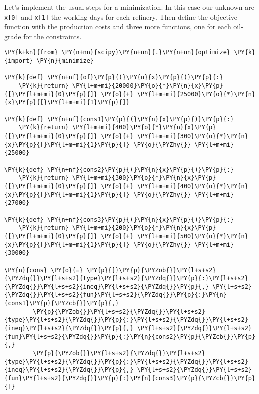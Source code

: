 \begin{Answer}
Let's implement the usual steps for a minimization. In this case our unknown are \texttt{x[0]} and \texttt{x[1]} the working days for each refinery. Then define the objective function with the production costs and three more functions, one for each oil-grade for the constraints.
\begin{codebox}[breakable, size=fbox, boxrule=1pt, pad at break*=1mm,colback=cellbackground, colframe=cellborder]
\begin{Verbatim}[commandchars=\\\{\}]
\PY{k+kn}{from} \PY{n+nn}{scipy}\PY{n+nn}{.}\PY{n+nn}{optimize} \PY{k}{import} \PY{n}{minimize}

\PY{k}{def} \PY{n+nf}{of}\PY{p}{(}\PY{n}{x}\PY{p}{)}\PY{p}{:}
    \PY{k}{return} \PY{l+m+mi}{20000}\PY{o}{*}\PY{n}{x}\PY{p}{[}\PY{l+m+mi}{0}\PY{p}{]} \PY{o}{+} \PY{l+m+mi}{25000}\PY{o}{*}\PY{n}{x}\PY{p}{[}\PY{l+m+mi}{1}\PY{p}{]}

\PY{k}{def} \PY{n+nf}{cons1}\PY{p}{(}\PY{n}{x}\PY{p}{)}\PY{p}{:}
    \PY{k}{return} \PY{l+m+mi}{400}\PY{o}{*}\PY{n}{x}\PY{p}{[}\PY{l+m+mi}{0}\PY{p}{]} \PY{o}{+} \PY{l+m+mi}{300}\PY{o}{*}\PY{n}{x}\PY{p}{[}\PY{l+m+mi}{1}\PY{p}{]} \PY{o}{\PYZhy{}} \PY{l+m+mi}{25000}

\PY{k}{def} \PY{n+nf}{cons2}\PY{p}{(}\PY{n}{x}\PY{p}{)}\PY{p}{:}
    \PY{k}{return} \PY{l+m+mi}{300}\PY{o}{*}\PY{n}{x}\PY{p}{[}\PY{l+m+mi}{0}\PY{p}{]} \PY{o}{+} \PY{l+m+mi}{400}\PY{o}{*}\PY{n}{x}\PY{p}{[}\PY{l+m+mi}{1}\PY{p}{]} \PY{o}{\PYZhy{}} \PY{l+m+mi}{27000}

\PY{k}{def} \PY{n+nf}{cons3}\PY{p}{(}\PY{n}{x}\PY{p}{)}\PY{p}{:}
    \PY{k}{return} \PY{l+m+mi}{200}\PY{o}{*}\PY{n}{x}\PY{p}{[}\PY{l+m+mi}{0}\PY{p}{]} \PY{o}{+} \PY{l+m+mi}{500}\PY{o}{*}\PY{n}{x}\PY{p}{[}\PY{l+m+mi}{1}\PY{p}{]} \PY{o}{\PYZhy{}} \PY{l+m+mi}{30000}

\PY{n}{cons} \PY{o}{=} \PY{p}{[}\PY{p}{\PYZob{}}\PY{l+s+s2}{\PYZdq{}}\PY{l+s+s2}{type}\PY{l+s+s2}{\PYZdq{}}\PY{p}{:}\PY{l+s+s2}{\PYZdq{}}\PY{l+s+s2}{ineq}\PY{l+s+s2}{\PYZdq{}}\PY{p}{,} \PY{l+s+s2}{\PYZdq{}}\PY{l+s+s2}{fun}\PY{l+s+s2}{\PYZdq{}}\PY{p}{:}\PY{n}{cons1}\PY{p}{\PYZcb{}}\PY{p}{,}
        \PY{p}{\PYZob{}}\PY{l+s+s2}{\PYZdq{}}\PY{l+s+s2}{type}\PY{l+s+s2}{\PYZdq{}}\PY{p}{:}\PY{l+s+s2}{\PYZdq{}}\PY{l+s+s2}{ineq}\PY{l+s+s2}{\PYZdq{}}\PY{p}{,} \PY{l+s+s2}{\PYZdq{}}\PY{l+s+s2}{fun}\PY{l+s+s2}{\PYZdq{}}\PY{p}{:}\PY{n}{cons2}\PY{p}{\PYZcb{}}\PY{p}{,}
        \PY{p}{\PYZob{}}\PY{l+s+s2}{\PYZdq{}}\PY{l+s+s2}{type}\PY{l+s+s2}{\PYZdq{}}\PY{p}{:}\PY{l+s+s2}{\PYZdq{}}\PY{l+s+s2}{ineq}\PY{l+s+s2}{\PYZdq{}}\PY{p}{,} \PY{l+s+s2}{\PYZdq{}}\PY{l+s+s2}{fun}\PY{l+s+s2}{\PYZdq{}}\PY{p}{:}\PY{n}{cons3}\PY{p}{\PYZcb{}}\PY{p}{]}
    \end{Verbatim}
\end{codebox}


\end{Answer}
